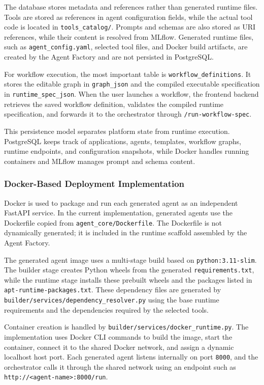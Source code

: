 The database stores metadata and references rather than generated runtime files. Tools are stored as references in agent configuration fields, while the actual tool code is located in \texttt{tools\_catalog/}. Prompts and schemas are also stored as URI references, while their content is resolved from MLflow. Generated runtime files, such as \texttt{agent\_config.yaml}, selected tool files, and Docker build artifacts, are created by the Agent Factory and are not persisted in PostgreSQL.

For workflow execution, the most important table is \texttt{workflow\_definitions}. It stores the editable graph in \texttt{graph\_json} and the compiled executable specification in \texttt{runtime\_spec\_json}. When the user launches a workflow, the frontend backend retrieves the saved workflow definition, validates the compiled runtime specification, and forwards it to the orchestrator through \texttt{/run-workflow-spec}.

This persistence model separates platform state from runtime execution. PostgreSQL keeps track of applications, agents, templates, workflow graphs, runtime endpoints, and configuration snapshots, while Docker handles running containers and MLflow manages prompt and schema content.

    \subsubsection{Docker-Based Deployment Implementation}

\label{sec:docker-deployment-implementation}

Docker is used to package and run each generated agent as an independent FastAPI service. In the current implementation, generated agents use the Dockerfile copied from \texttt{agent\_core/Dockerfile}. The Dockerfile is not dynamically generated; it is included in the runtime scaffold assembled by the Agent Factory.

The generated agent image uses a multi-stage build based on \texttt{python:3.11-slim}. The builder stage creates Python wheels from the generated \texttt{requirements.txt}, while the runtime stage installs these prebuilt wheels and the packages listed in \texttt{apt-runtime-packages.txt}. These dependency files are generated by \texttt{builder/services/dependency\_resolver.py} using the base runtime requirements and the dependencies required by the selected tools.

Container creation is handled by \texttt{builder/services/docker\_runtime.py}. The implementation uses Docker CLI commands to build the image, start the container, connect it to the shared Docker network, and assign a dynamic localhost host port. Each generated agent listens internally on port \texttt{8000}, and the orchestrator calls it through the shared network using an endpoint such as \texttt{http://<agent-name>:8000/run}.


